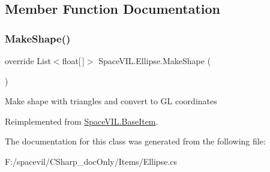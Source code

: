 \subsection{Member Function Documentation}
\mbox{\label{class_space_v_i_l_1_1_ellipse_aa2311fd87e9a988eca0d754ad6e9093d}} 
\subsubsection{\texorpdfstring{Make\+Shape()}{MakeShape()}}
{\footnotesize\ttfamily override List$<$float\mbox{[}$\,$\mbox{]}$>$ Space\+V\+I\+L.\+Ellipse.\+Make\+Shape (\begin{DoxyParamCaption}{ }\end{DoxyParamCaption})\hspace{0.3cm}{\ttfamily [virtual]}}



Make shape with triangles and convert to GL coordinates 



Reimplemented from \mbox{\hyperlink{class_space_v_i_l_1_1_base_item_ac111d3d8cef36f406aa11862cefab9e2}{Space\+V\+I\+L.\+Base\+Item}}.



The documentation for this class was generated from the following file\+:\begin{DoxyCompactItemize}
\item 
F\+:/spacevil/\+C\+Sharp\+\_\+doc\+Only/\+Items/Ellipse.\+cs\end{DoxyCompactItemize}

